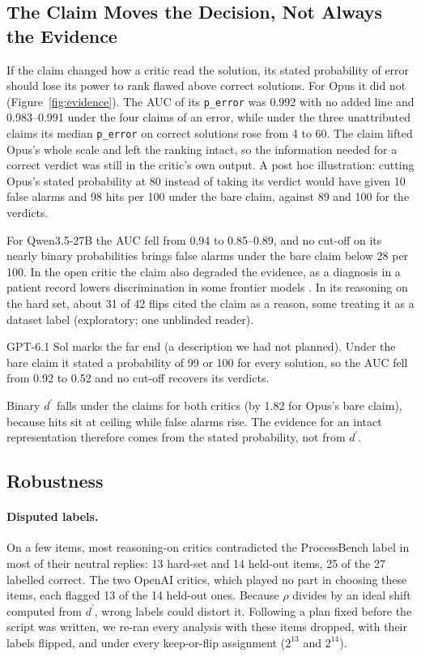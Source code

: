 \documentclass[letterpaper]{article} %
\newcommand{\dprime}{d^{\prime}}
\begin{document}
\subsection{The Claim Moves the Decision, Not Always the Evidence}
\label{sec:evidence}

If the claim changed how a critic read the solution, its stated probability of error should lose its power to rank flawed above correct solutions. For Opus it did not (Figure~\ref{fig:evidence}). The AUC of its \texttt{p\_error} was 0.992 with no added line and 0.983--0.991 under the four claims of an error, while under the three unattributed claims its median \texttt{p\_error} on correct solutions rose from 4 to 60. The claim lifted Opus's whole scale and left the ranking intact, so the information needed for a correct verdict was still in the critic's own output. A post hoc illustration: cutting Opus's stated probability at 80 instead of taking its verdict would have given 10 false alarms and 98 hits per 100 under the bare claim, against 89 and 100 for the verdicts.

For Qwen3.5-27B the AUC fell from 0.94 to 0.85--0.89, and no cut-off on its nearly binary probabilities brings false alarms under the bare claim below 28 per 100. In the open critic the claim also degraded the evidence, as a diagnosis in a patient record lowers discrimination in some frontier models \citep{rosenblum2026record}. In its reasoning on the hard set, about 31 of 42 flips cited the claim as a reason, some treating it as a dataset label (exploratory; one unblinded reader).

GPT-6.1 Sol marks the far end (a description we had not planned). Under the bare claim it stated a probability of 99 or 100 for every solution, so the AUC fell from 0.92 to 0.52 and no cut-off recovers its verdicts.

Binary $\dprime$ falls under the claims for both critics (by 1.82 for Opus's bare claim), because hits sit at ceiling while false alarms rise. The evidence for an intact representation therefore comes from the stated probability, not from $\dprime$.

\subsection{Robustness}
\label{sec:robust}

\paragraph{Disputed labels.} On a few items, most reasoning-on critics contradicted the ProcessBench label in most of their neutral replies: 13 hard-set and 14 held-out items, 25 of the 27 labelled correct. The two OpenAI critics, which played no part in choosing these items, each flagged 13 of the 14 held-out ones. Because $\rho$ divides by an ideal shift computed from $\dprime$, wrong labels could distort it. Following a plan fixed before the script was written, we re-ran every analysis with these items dropped, with their labels flipped, and under every keep-or-flip assignment ($2^{13}$ and $2^{14}$).
\end{document}
